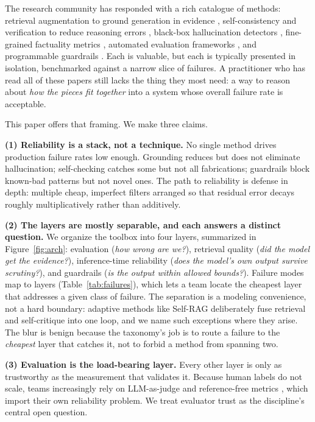 \documentclass[11pt]{article}
\begin{document}
The research community has responded with a rich catalogue of methods:
retrieval augmentation to ground generation in evidence
\citep{lewis2020rag,shuster2021retrieval}, self-consistency and verification to
reduce reasoning errors \citep{wang2023selfconsistency,dhuliawala2023cove},
black-box hallucination detectors \citep{manakul2023selfcheckgpt},
fine-grained factuality metrics \citep{min2023factscore}, automated evaluation
frameworks \citep{es2023ragas,saadfalcon2024ares,zheng2023mtbench}, and
programmable guardrails \citep{rebedea2023nemo,bai2022constitutional}. Each is
valuable, but each is typically presented in isolation, benchmarked against a
narrow slice of failures. A practitioner who has read all of these papers still
lacks the thing they most need: a way to reason about \emph{how the pieces fit
together} into a system whose overall failure rate is acceptable.

This paper offers that framing. We make three claims.

\textbf{(1) Reliability is a stack, not a technique.} No single method drives
production failure rates low enough. Grounding reduces but does not eliminate
hallucination; self-checking catches some but not all fabrications; guardrails
block known-bad patterns but not novel ones. The path to reliability is defense
in depth: multiple cheap, imperfect filters arranged so that residual error
decays roughly multiplicatively rather than additively.

\textbf{(2) The layers are mostly separable, and each answers a distinct
question.} We organize the toolbox into four layers, summarized in
Figure~\ref{fig:arch}: evaluation (\emph{how wrong are we?}), retrieval quality
(\emph{did the model get the evidence?}), inference-time reliability
(\emph{does the model's own output survive scrutiny?}), and guardrails
(\emph{is the output within allowed bounds?}). Failure modes map to layers
(Table~\ref{tab:failures}), which lets a team locate the cheapest layer that
addresses a given class of failure. The separation is a modeling convenience,
not a hard boundary: adaptive methods like Self-RAG \citep{asai2024selfrag}
deliberately fuse retrieval and self-critique into one loop, and we name such
exceptions where they arise. The blur is benign because the taxonomy's job is to
route a failure to the \emph{cheapest} layer that catches it, not to forbid a
method from spanning two.

\textbf{(3) Evaluation is the load-bearing layer.} Every other layer is only as
trustworthy as the measurement that validates it. Because human labels do not
scale, teams increasingly rely on LLM-as-judge and reference-free metrics
\citep{zheng2023mtbench,es2023ragas}, which import their own reliability
problem. We treat evaluator trust as the discipline's central open question.
\end{document}
